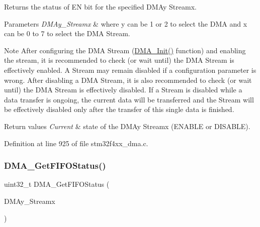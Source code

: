 Returns the status of EN bit for the specified D\+M\+Ay Streamx. 


\begin{DoxyParams}{Parameters}
{\em D\+M\+Ay\+\_\+\+Streamx} & where y can be 1 or 2 to select the D\+MA and x can be 0 to 7 to select the D\+MA Stream.\\
\hline
\end{DoxyParams}
\begin{DoxyNote}{Note}
After configuring the D\+MA Stream (\hyperlink{group___d_m_a___group1_gaced8a4149acfb0a50b50e63273a87148}{D\+M\+A\+\_\+\+Init()} function) and enabling the stream, it is recommended to check (or wait until) the D\+MA Stream is effectively enabled. A Stream may remain disabled if a configuration parameter is wrong. After disabling a D\+MA Stream, it is also recommended to check (or wait until) the D\+MA Stream is effectively disabled. If a Stream is disabled while a data transfer is ongoing, the current data will be transferred and the Stream will be effectively disabled only after the transfer of this single data is finished.
\end{DoxyNote}

\begin{DoxyRetVals}{Return values}
{\em Current} & state of the D\+M\+Ay Streamx (E\+N\+A\+B\+LE or D\+I\+S\+A\+B\+LE). \\
\hline
\end{DoxyRetVals}


Definition at line 925 of file stm32f4xx\+\_\+dma.\+c.

\mbox{\label{group___d_m_a___group4_ga9893809a7067861ec111f7d712ebf28d}} 
\subsubsection{\texorpdfstring{D\+M\+A\+\_\+\+Get\+F\+I\+F\+O\+Status()}{DMA\_GetFIFOStatus()}}
{\footnotesize\ttfamily uint32\+\_\+t D\+M\+A\+\_\+\+Get\+F\+I\+F\+O\+Status (\begin{DoxyParamCaption}\item[{\hyperlink{struct_d_m_a___stream___type_def}{D\+M\+A\+\_\+\+Stream\+\_\+\+Type\+Def} $\ast$}]{D\+M\+Ay\+\_\+\+Streamx }\end{DoxyParamCaption})}



